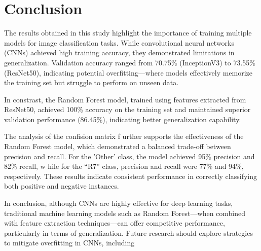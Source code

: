 \documentclass[10pt,conference]{IEEEtran}
\begin{document}
\section*{Conclusion }
The results obtained in this study highlight the importance of training multiple models for image classification tasks. While convolutional neural networks (CNNs) achieved high training accuracy, they demonstrated limitations in generalization. Validation accuracy ranged from 70.75\% (InceptionV3) to 73.55\% (ResNet50), indicating potential overfitting—where models effectively memorize the training set but struggle to perform on unseen data. 

In constrast, the Random Forest model, trained using features extracted from ResNet50, achieved 100\% accuracy on the training set and maintained superior validation performance (86.45\%), indicating better generalization capability. 

The analysis of the confision matrix f urther supports the effectiveness of the Random Forest model, which demonstrated a balanced trade-off between precision and recall. For the 'Other' class, the model achieved 95\% precision and 82\% recall, w hile for the “R7” class, precision and recall were 77\% and 94\%, respectively. These results indicate consistent performance in correctly classifying both positive and negative instances. 

In conclusion, although CNNs are highly effective for deep learning tasks, traditional machine learning models such as Random Forest—when combined with feature extraction techniques—can offer competitive performance, particularly in terms of generalization. Future research should explore strategies to mitigate overfitting in CNNs, including

 
\end{document}
